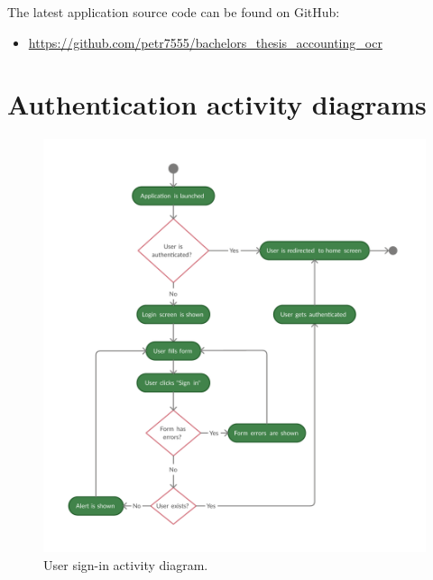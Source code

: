 \documentclass[
  digital, %
  table,   %
  oneside, %
  lof,     %
  lot,     %
]{fithesis3}
\begin{document}
The latest application source code can be found on GitHub:
\begin{itemize}
\item \url{https://github.com/petr7555/bachelors_thesis_accounting_ocr}
\end{itemize}

\newpage
\section{Authentication activity diagrams}
    \begin{figure}[H]
        \begin{center}
            \includegraphics[width=\textwidth]{figures/diagrams/sign_in_flow}
        \end{center}
        \caption{User sign-in activity diagram.}
        \label{fig:sign_in_flow}
    \end{figure}
    
\end{document}
